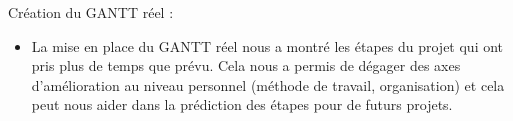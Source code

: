 \documentclass{article}
\begin{document}
    Création du GANTT réel :
\newline 
 \begin{itemize} 
  \item La mise en place du GANTT réel nous a montré les étapes du projet qui ont pris plus de temps que prévu. 
  Cela nous a permis de dégager des axes d'amélioration au niveau personnel (méthode de travail, organisation) et cela peut nous aider dans la prédiction des étapes pour de futurs projets.
  \end{itemize}
 
  
\end{document}
